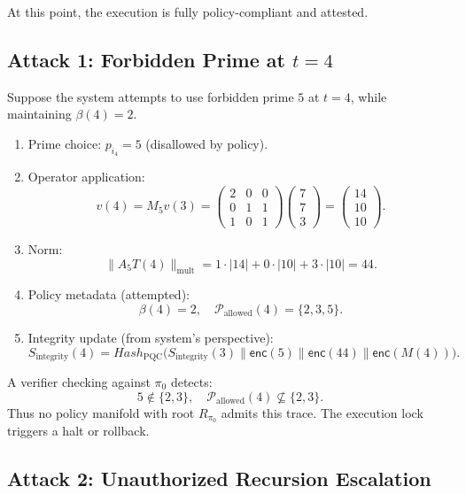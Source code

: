\documentclass[11pt]{article}
\begin{document}
At this point, the execution is fully policy-compliant and attested.

\subsection{Attack 1: Forbidden Prime at \(t=4\)}

Suppose the system attempts to use forbidden prime \(5\) at \(t=4\), while maintaining \(\beta(4)=2\).

\begin{enumerate}[leftmargin=1.5em]
  \item Prime choice: \(p_{i_4} = 5\) (disallowed by policy).
  \item Operator application:
  \[
    v(4) = M_5 v(3) =
    \begin{pmatrix}
    2 & 0 & 0 \\
    0 & 1 & 1 \\
    1 & 0 & 1
    \end{pmatrix}
    \begin{pmatrix}7\\7\\3\end{pmatrix}
    = \begin{pmatrix}14\\10\\10\end{pmatrix}.
  \]
  \item Norm:
  \[
    \|A_{5}T(4)\|_{\text{mult}} =
    1\cdot|14| + 0\cdot|10| + 3\cdot|10| = 44.
  \]
  \item Policy metadata (attempted):
  \[
    \beta(4) = 2, \quad
    \mathcal{P}_{\text{allowed}}(4) = \{2,3,5\}.
  \]
  \item Integrity update (from system's perspective):
  \[
    S_{\text{integrity}}(4)
    = Hash_{\text{PQC}}\big(
      S_{\text{integrity}}(3) \parallel \mathsf{enc}(5)\parallel \mathsf{enc}(44)\parallel \mathsf{enc}(M(4))
    \big).
  \]
\end{enumerate}

A verifier checking against \(\pi_0\) detects:
\[
  5 \notin \{2,3\}, \quad
  \mathcal{P}_{\text{allowed}}(4) \nsubseteq \{2,3\}.
\]
Thus no policy manifold with root \(R_{\pi_0}\) admits this trace.
The execution lock triggers a halt or rollback.

\subsection{Attack 2: Unauthorized Recursion Escalation}
\end{document}
